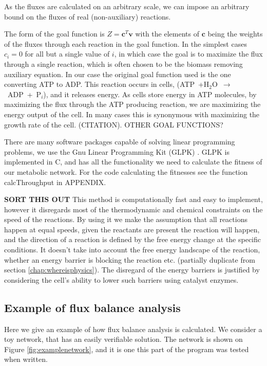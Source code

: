 \documentclass[10pt,a4paper]{article}
\begin{document}
	As the fluxes are calculated on an arbitrary scale, we can impose an arbitrary bound on the fluxes of real (non-auxiliary) reactions.


	The form of the goal function is $Z=\mathbf{c}^T \mathbf{v}$ with the elements of $\mathbf{c}$ being the weights of the fluxes through each reaction in the goal function. In the simplest cases $c_i=0$ for all but a single value of $i$, in which case the goal is to maximize the flux through a single reaction, which is often chosen to be the biomass removing auxiliary equation. In our case the original goal function used is the one converting ATP to ADP. This reaction occurs in cells, (ATP~+H$_2$O~$\rightarrow$~ADP~+~P$_i$), and it releases energy. As cells store energy in ATP molecules,  by maximizing the flux through the ATP producing reaction, we are maximizing the energy output of the cell. In many cases this is synonymous with maximizing the growth rate of the cell. (CITATION). OTHER GOAL FUNCTIONS?
	
	There are many software packages capable of solving linear programming problems, we use the Gnu Linear Programming Kit (GLPK) \cite{glpk}. GLPK is implemented in C, and has all the functionality we need to calculate the fitness of our metabolic network. For the code calculating the fitnesses see the function calcThroughput in APPENDIX.

	\textbf{SORT THIS OUT}
	This method is computationally fast and easy to implement, however it disregards most of the thermodynamic and chemical constraints on the speed of the reactions. By using it we make the assumption that all reactions happen at equal speeds, given the reactants are present the reaction will happen, and the direction of a reaction is defined by the free energy change at the specific conditions. It doesn't take into account the free energy landscape of the reaction, whether an energy barrier is blocking the reaction etc. (partially duplicate from section \ref{chap:whereisphysics}). The disregard of the energy barriers is justified by considering the cell's ability to lower such barriers using catalyst enzymes.

\subsection{Example of flux balance analysis}
\label{sub:example_of_flux_balance_analysis}

Here we give an example of how flux balance analysis is calculated. We consider a toy network, that has an easily verifiable solution. The network is shown on Figure \ref{fig:examplenetwork}, and it is one this part of the program was tested when written. 
\end{document}
